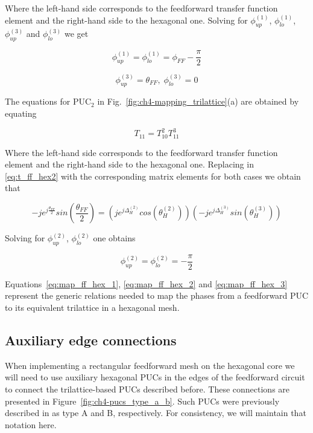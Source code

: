 Where the left-hand side corresponds to the feedforward transfer function element and the right-hand side to the hexagonal one.
Solving for $\phi^{(1)}_{up}$, $\phi^{(1)}_{lo}$, $\phi^{(3)}_{up}$ and $\phi^{(3)}_{lo}$ we get

\begin{equation}
	\label{eq:map_ff_hex_1}
	\phi^{(1)}_{up} = \phi^{(1)}_{lo} = \phi_{FF} - \frac{\pi}{2}
\end{equation}

\begin{equation}
	\label{eq:map_ff_hex_2}
	\phi^{(3)}_{up} = \theta_{FF},\; \phi^{(3)}_{lo} = 0
\end{equation}

The equations for PUC\(_2\) in Fig.~\ref{fig:ch4-mapping_trilattice}(a) are obtained by equating

\begin{equation}
	\label{eq:t_ff_hex2}
	T_{11} = T^{2}_{10}T^{3}_{11} \end{equation}

Where the left-hand side corresponds to the feedforward transfer function element and the right-hand side to the hexagonal one.
Replacing in \eqref{eq:t_ff_hex2} with the corresponding matrix elements for both cases we obtain that

\begin{equation}
	\label{eq:t_ff_hex3}
	-je^{j\frac{\theta_{FF}}{2}}sin(\frac{\theta_{FF}}{2}) = (je^{j\Delta^{(2)}_{H}}cos(\theta^{(2)}_{H}))(-je^{j\Delta^{(3)}_{H}}sin(\theta^{(3)}_{H}))
\end{equation}

Solving for $\phi^{(2)}_{up}$, $\phi^{(2)}_{lo}$ one obtains

\begin{equation}
	\label{eq:map_ff_hex_3}
	\phi^{(2)}_{up} = \phi^{(2)}_{lo} = - \frac{\pi}{2}
\end{equation}

Equations~\eqref{eq:map_ff_hex_1}, \eqref{eq:map_ff_hex_2} and \eqref{eq:map_ff_hex_3} represent the generic relations needed to map the phases from a feedforward PUC to its equivalent trilattice in a hexagonal mesh.

\subsection{Auxiliary edge connections}

When implementing a rectangular feedforward mesh on the hexagonal core we will need to use auxiliary hexagonal PUCs in the edges of the feedforward circuit to connect the trilattice-based PUCs described before.
These connections are presented in Figure~\ref{fig:ch4-pucs_type_a_b}.
Such PUCs were previously described in \cite{perez_silicon_2017} as type A and B, respectively.
For consistency, we will maintain that notation here.

